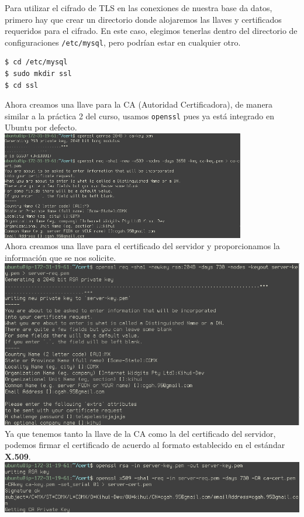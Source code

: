 \documentclass[9pt]{article}
\begin{document}
Para utilizar el cifrado de \textsf{TLS} en las conexiones de nuestra base da datos, primero hay que crear un directorio donde alojaremos las llaves y certificados requeridos para el cifrado. En este caso, elegimos tenerlas dentro del directorio de configuraciones \texttt{/etc/mysql}, pero podrían estar en cualquier otro.

\begin{verbatim}
$ cd /etc/mysql
$ sudo mkdir ssl
$ cd ssl
\end{verbatim}

Ahora creamos una llave para la \textsf{CA} (Autoridad Certificadora), de manera similar a la práctica 2 del curso,  usamos \texttt{openssl} pues ya está integrado en \textsf{Ubuntu} por defecto. \\
\includegraphics[width=0.8\textwidth]{mysql_cert}\\

Ahora creamos una llave para el certificado del servidor y proporcionamos la información que se nos solicite. \\
\includegraphics[width=\textwidth]{mysql_server-key}\\

Ya que tenemos tanto la llave de la \textsf{CA} como la del certificado del servidor, podemos firmar el certificado de acuerdo al formato establecido en el estándar \textbf{X.509}. \\
\includegraphics[width=\textwidth]{mysql_server-cert}\\
\end{document}
